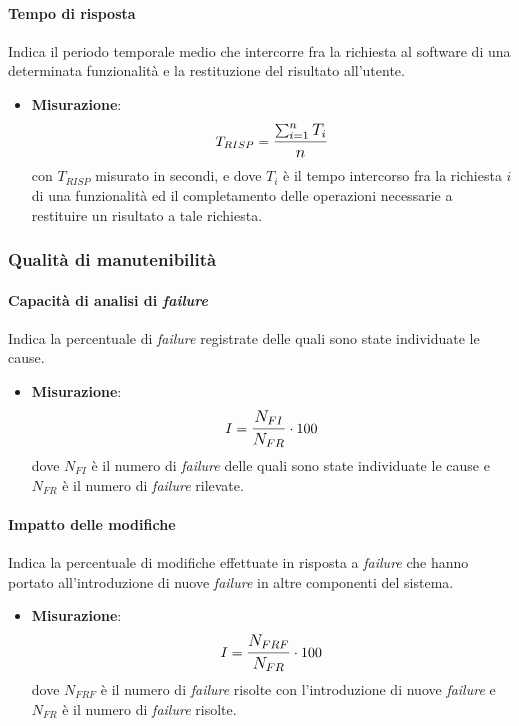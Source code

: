 \paragraph{Tempo di risposta}
Indica il periodo temporale medio che intercorre fra la richiesta al software di una determinata funzionalità e la restituzione del risultato all'utente.
\begin{itemize}
	\item \textbf{Misurazione}: 
		$$T_{RISP} = \mathlarger{\frac{\sum_{i=1}^{n} T_{i}}{n}}$$ 
	con $T_{RISP}$ misurato in secondi, e dove $T_{i}$ è il tempo intercorso fra la richiesta $i$ di una funzionalità ed il completamento delle operazioni necessarie a restituire un risultato a tale richiesta.
\end{itemize}
\subsubsection{Qualità di manutenibilità}

\paragraph{Capacità di analisi di \textit{failure}}
Indica la percentuale di \textit{failure} registrate delle quali sono state individuate le cause.
\begin{itemize}
	\item \textbf{Misurazione}: 
		$$I=\mathlarger{\frac{N_{FI}}{N_{FR}}} \cdot 100$$
	dove $N_{FI}$ è il numero di \textit{failure} delle quali sono state individuate le cause e $N_{FR}$ è il numero di \textit{failure} rilevate.
\end{itemize}

\paragraph{Impatto delle modifiche}
Indica la percentuale di modifiche effettuate in risposta a \textit{failure} che hanno portato all'introduzione di nuove \textit{failure} in altre componenti del sistema.
\begin{itemize}
	\item \textbf{Misurazione}: 
		$$I=\mathlarger{\frac{N_{FRF}}{N_{FR}}} \cdot 100$$
	dove $N_{FRF}$ è il numero di \textit{failure} risolte con l'introduzione di nuove \textit{failure} e $N_{FR}$ è il numero di \textit{failure} risolte.
\end{itemize}


